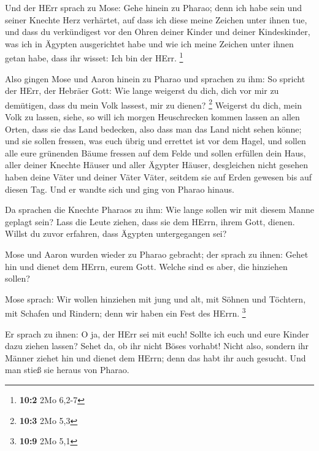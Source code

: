  Und der HErr sprach zu Mose: Gehe hinein zu Pharao; denn
ich habe sein und seiner Knechte Herz verhärtet, auf dass ich diese
meine Zeichen unter ihnen tue,  und dass du verkündigest
vor den Ohren deiner Kinder und deiner Kindeskinder, was ich in Ägypten
ausgerichtet habe und wie ich meine Zeichen unter ihnen getan habe, dass
ihr wisset: Ich bin der HErr. \footnote{\textbf{10:2} 2Mo 6,2-7}

 Also gingen Mose und Aaron hinein zu Pharao und sprachen
zu ihm: So spricht der HErr, der Hebräer Gott: Wie lange weigerst du
dich, dich vor mir zu demütigen, dass du mein Volk lassest, mir zu
dienen? \footnote{\textbf{10:3} 2Mo 5,3}  Weigerst du
dich, mein Volk zu lassen, siehe, so will ich morgen Heuschrecken kommen
lassen an allen Orten,  dass sie das Land bedecken, also
dass man das Land nicht sehen könne; und sie sollen fressen, was euch
übrig und errettet ist vor dem Hagel, und sollen alle eure grünenden
Bäume fressen auf dem Felde  und sollen erfüllen dein
Haus, aller deiner Knechte Häuser und aller Ägypter Häuser, desgleichen
nicht gesehen haben deine Väter und deiner Väter Väter, seitdem sie auf
Erden gewesen bis auf diesen Tag. Und er wandte sich und ging von Pharao
hinaus.

 Da sprachen die Knechte Pharaos zu ihm: Wie lange sollen
wir mit diesem Manne geplagt sein? Lass die Leute ziehen, dass sie dem
HErrn, ihrem Gott, dienen. Willst du zuvor erfahren, dass Ägypten
untergegangen sei?

 Mose und Aaron wurden wieder zu Pharao gebracht; der
sprach zu ihnen: Gehet hin und dienet dem HErrn, eurem Gott. Welche sind
es aber, die hinziehen sollen?

 Mose sprach: Wir wollen hinziehen mit jung und alt, mit
Söhnen und Töchtern, mit Schafen und Rindern; denn wir haben ein Fest
des HErrn. \footnote{\textbf{10:9} 2Mo 5,1}

 Er sprach zu ihnen: O ja, der HErr sei mit euch! Sollte
ich euch und eure Kinder dazu ziehen lassen? Sehet da, ob ihr nicht
Böses vorhabt!  Nicht also, sondern ihr Männer ziehet hin
und dienet dem HErrn; denn das habt ihr auch gesucht. Und man stieß sie
heraus von Pharao.

